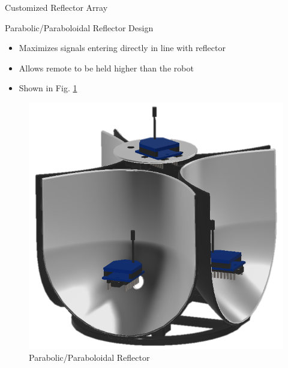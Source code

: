 \documentclass{beamer}
\begin{document}
\begin{frame}{Customized Reflector Array}
  \begin{block}{Parabolic/Paraboloidal Reflector Design}
    \begin{itemize}
      \item Maximizes signals entering directly in line with reflector
      \item Allows remote to be held higher than the robot
      \item Shown in Fig. \ref{fig:reflectorDesign2}
    \end{itemize}
  \end{block}
  \begin{figure}
    \centering
    \includegraphics[height=0.5\textheight]{figs/img/parabolicReflector.png}
    \caption{Parabolic/Paraboloidal Reflector}
    \label{fig:reflectorDesign2}
  \end{figure}
\end{frame}
\end{document}
